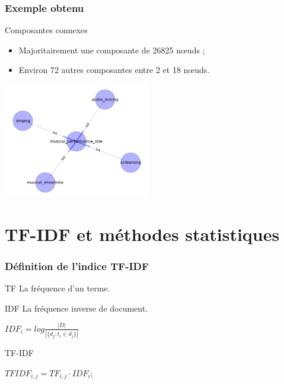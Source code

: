 \documentclass[12pt, handout]{beamer}
\begin{document}
\begin{frame}
 \frametitle{Exemple obtenu}
 
 \begin{block}{Composantes connexes}
 \begin{itemize}
  \item Majoritairement une composante de 26825 n\oe uds ;
  \item Environ 72 autres composantes entre 2 et 18 n\oe uds.
 \end{itemize}
 \end{block}

 \includegraphics[height=5cm]{./images/comp_connexe_3.png}
 
 
\end{frame}



 
 


\section{TF-IDF et méthodes statistiques}

\begin{frame}
 \frametitle{Définition de l'indice TF-IDF}
 \begin{block}{TF}
 	La fréquence d'un terme.
 \end{block}
 \begin{block}{IDF}
 	La fréquence inverse de document.\\
 	\begin{center}
 	 	$IDF_{i} =  log \frac{|D|}{|\{d_{j}: t_{i} \in d_{j}\}|}$
 	\end{center}
 \end{block}
 \begin{block}{TF-IDF}
 	\begin{center}
 		$TFIDF_{i,j} = TF_{i,j} \cdot  IDF_{i}$;
 	\end{center}
 \end{block}

 
 \end{frame}
\end{document}
